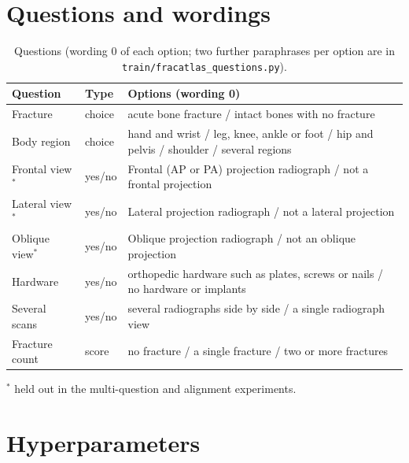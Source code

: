 \documentclass[11pt]{article}
\begin{document}



\clearpage
\appendix

\section{Questions and wordings}
\label{app:questions}

\begin{table}[!h]
  \centering\small
  \caption{Questions (wording 0 of each option; two further paraphrases per option are in
  \texttt{train/fracatlas\_questions.py}).}
  \begin{tabular}{llp{10cm}}
    \toprule
    Question & Type & Options (wording 0) \\
    \midrule
    Fracture & choice & acute bone fracture / intact bones with no fracture \\
    Body region & choice & hand and wrist / leg, knee, ankle or foot / hip and pelvis / shoulder / several regions \\
    Frontal view$^{*}$ & yes/no & Frontal (AP or PA) projection radiograph / not a frontal projection \\
    Lateral view$^{*}$ & yes/no & Lateral projection radiograph / not a lateral projection \\
    Oblique view$^{*}$ & yes/no & Oblique projection radiograph / not an oblique projection \\
    Hardware & yes/no & orthopedic hardware such as plates, screws or nails / no hardware or implants \\
    Several scans & yes/no & several radiographs side by side / a single radiograph view \\
    Fracture count & score & no fracture / a single fracture / two or more fractures \\
    \bottomrule
  \end{tabular}

  \smallskip
  {\footnotesize $^{*}$ held out in the multi-question and alignment experiments.}
\end{table}

\section{Hyperparameters}
\label{app:hparams}
\end{document}
